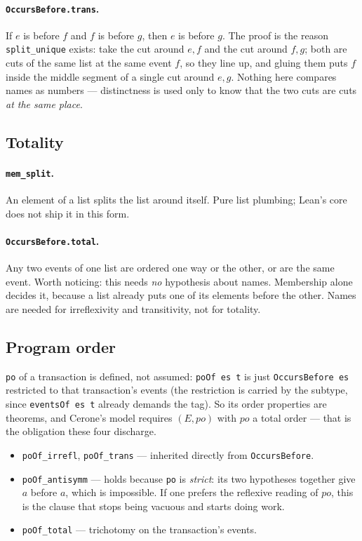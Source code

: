 \documentclass[11pt]{article}
\newcommand{\lean}[1]{\texttt{\small #1}}
\begin{document}
\paragraph{\lean{OccursBefore.trans}.}
If $e$ is before $f$ and $f$ is before $g$, then $e$ is before $g$. The proof is
the reason \lean{split\_unique} exists: take the cut around $e,f$ and the cut
around $f,g$; both are cuts of the same list at the same event $f$, so they line
up, and gluing them puts $f$ inside the middle segment of a single cut around
$e,g$. Nothing here compares names as numbers --- distinctness is used only to
know that the two cuts are cuts \emph{at the same place}.

\subsection{Totality}

\paragraph{\lean{mem\_split}.}
An element of a list splits the list around itself. Pure list plumbing; Lean's
core does not ship it in this form.

\paragraph{\lean{OccursBefore.total}.}
Any two events of one list are ordered one way or the other, or are the same
event. Worth noticing: this needs \emph{no} hypothesis about names. Membership
alone decides it, because a list already puts one of its elements before the
other. Names are needed for irreflexivity and transitivity, not for totality.

\subsection{Program order}

\lean{po} of a transaction is defined, not assumed: \lean{poOf es t} is just
\lean{OccursBefore es} restricted to that transaction's events (the restriction
is carried by the subtype, since \lean{eventsOf es t} already demands the tag).
So its order properties are theorems, and Cerone's model requires $(E, po)$ with
$po$ a total order --- that is the obligation these four discharge.

\begin{itemize}
  \item \lean{poOf\_irrefl}, \lean{poOf\_trans} --- inherited directly from
        \lean{OccursBefore}.
  \item \lean{poOf\_antisymm} --- holds because \lean{po} is \emph{strict}: its
        two hypotheses together give $a$ before $a$, which is impossible. If one
        prefers the reflexive reading of $po$, this is the clause that stops
        being vacuous and starts doing work.
  \item \lean{poOf\_total} --- trichotomy on the transaction's events.
\end{itemize}
\end{document}
